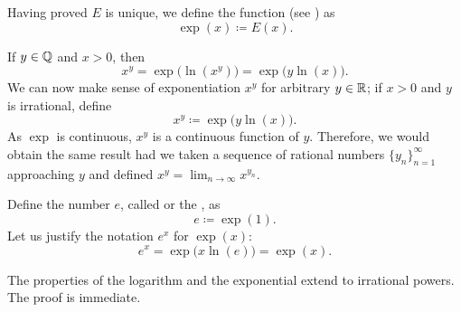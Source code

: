 Having proved $E$ is unique, we define the
\emph{} function (see ) as
\begin{equation*}
\exp(x) \coloneqq E(x) .
\end{equation*}
\begin{myfigureht}
\caption{Plot of $e^x$, together with a slope field giving slope $y$ at
every point $(x,y)$.
The equation $\frac{d}{dx} e^x = e^x$ means that $y=e^x$ follows these slopes.\label{fig:exp}}
\end{myfigureht}

If $y \in {\mathbb{Q}}$ and $x > 0$, then
\begin{equation*}
x^y = \exp\bigl(\ln(x^y)\bigr) = \exp\bigl(y\ln(x)\bigr) .
\end{equation*}
We can now make sense of exponentiation $x^y$ for arbitrary $y \in {\mathbb{R}}$;
if $x > 0$ and $y$ is irrational, define
\begin{equation*}
x^y \coloneqq \exp\bigl(y\ln(x)\bigr) .
\end{equation*}
As $\exp$ is continuous, $x^y$ is a continuous function of $y$.
Therefore, we would
obtain the same result had we taken a sequence of rational numbers
$\{ y_n \}_{n=1}^\infty$
approaching $y$ and defined $x^y = \lim_{n\to\infty} x^{y_n}$.

Define the number $e$,
called \emph{} or
the \emph{}, as
\begin{equation*}
e \coloneqq \exp(1) .
\end{equation*}
Let us justify the notation $e^x$ for $\exp(x)$:
\begin{equation*}
e^x = \exp\bigl(x \ln(e) \bigr) = \exp(x) .
\end{equation*}

The properties of the logarithm and the exponential extend to
irrational powers.  The proof is immediate.

